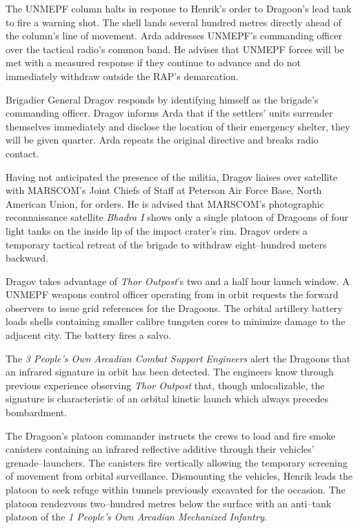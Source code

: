 The UNMEPF column halts in response to Henrik's order to Dragoon's lead tank to fire a warning shot. The shell lands several hundred metres directly ahead of the column's line of movement. Arda addresses UNMEPF's commanding officer over the tactical radio's common band. He advises that UNMEPF forces will be met with a measured response if they continue to advance and do not immediately withdraw outside the RAP's demarcation. 

Brigadier General Dragov responds by identifying himself as the brigade's commanding officer. Dragov informs Arda that if the settlers' units surrender themselves immediately and disclose the location of their emergency shelter, they will be given quarter. Arda repeats the original directive and breaks radio contact.

Having not anticipated the presence of the militia, Dragov liaises over satellite with MARSCOM's Joint Chiefs of Staff at Peterson Air Force Base, North American Union, for orders. He is advised that MARSCOM's photographic reconnaissance satellite {\it Bhadra I} shows only a single platoon of Dragoons of four light tanks on the inside lip of the impact crater's rim. Dragov orders a temporary tactical retreat of the brigade to withdraw eight--hundred meters backward.
\StopTimelineDate

Dragov takes advantage of {\it Thor Outpost}'s two and a half hour launch window. A UNMEPF weapons control officer operating from in orbit requests the forward observers to issue grid references for the Dragoons. The orbital artillery battery loads shells containing smaller calibre tungsten cores to minimize damage to the adjacent city. The battery fires a salvo.

The {\it 3 People's Own Arcadian Combat Support Engineers} alert the Dragoons that an infrared signature in orbit has been detected. The engineers know through previous experience observing {\it Thor Outpost} that, though unlocalizable, the signature is characteristic of an orbital kinetic launch which always precedes bombardment. 

The Dragoon's platoon commander instructs the crews to load and fire smoke canisters containing an infrared reflective additive through their vehicles' grenade--launchers. The canisters fire vertically allowing the temporary screening of movement from orbital surveillance. Dismounting the vehicles, Henrik leads the platoon to seek refuge within tunnels previously excavated for the occasion. The platoon rendezvous two--hundred metres below the surface with an anti--tank platoon of the {\it 1 People's Own Arcadian Mechanized Infantry}.

